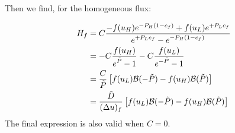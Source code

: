 \documentclass{book}
\begin{document}
Then we find, for the homogeneous flux:

\begin{align}
	H_f
	&=
	C\frac{
	- f(u_H)e^{-P_H(1-c_f)}
	+ f(u_L)e^{+P_Lc_f}
	}
	{\displaystyle
	     e^{+P_Lc_f} - e^{-P_H(1-c_f)}
	}
	\nonumber \\
	&=
	-C\frac{
	f(u_H)
	}
	{\displaystyle
	     e^{\tilde{P}} -1
	}
	-
	C\frac{
	f(u_L)
	}
	{\displaystyle
	     e^{-\tilde{P}} -1
	}
	\nonumber \\
	&=
	\frac{C}{\tilde{P}}\left[
		 f(u_L){\cal B}(-\tilde{P})
		-f(u_H){\cal B}( \tilde{P})
	\right]
	\nonumber \\
	&=
	\frac{\tilde{D}}{(\Delta u)_f}\left[
		 f(u_L){\cal B}(-\tilde{P})
		-f(u_H){\cal B}( \tilde{P})
	\right]
\end{align}
The final expression is also valid when $C=0$.



\end{document}
